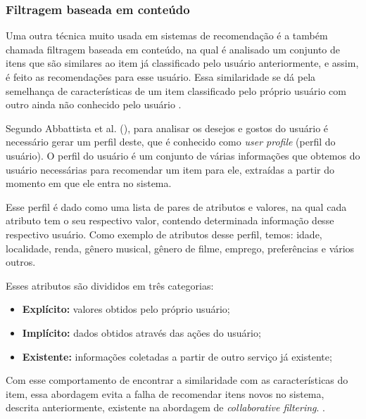 \subsubsection{Filtragem baseada em conteúdo}
\label{Contentbasedfiltering}

Uma outra técnica muito usada em sistemas de recomendação é a também chamada filtragem baseada em conteúdo, na qual é analisado um conjunto de itens que são similares ao item já classificado pelo usuário anteriormente, e assim, é feito as recomendações para esse usuário. Essa similaridade se dá pela semelhança de características de um item classificado pelo próprio usuário com outro ainda não conhecido pelo usuário \cite{Grimaldi:2018}. 

Segundo Abbattista et al. (\citeyear{Abbattista:2002}), para analisar os desejos e gostos do usuário é necessário gerar um perfil deste, que é conhecido como \textit{user profile} (perfil do usuário). O perfil do usuário é um conjunto de várias informações que obtemos do usuário necessárias para recomendar um item para ele, extraídas a partir do momento em que ele entra no sistema.

Esse perfil é dado como uma lista de pares de atributos e valores, na qual cada atributo tem o seu respectivo valor, contendo determinada informação desse respectivo usuário. Como exemplo de atributos desse perfil, temos: idade, localidade, renda, gênero musical, gênero de filme, emprego, preferências e vários outros.

Esses atributos são divididos em três categorias:
\begin{itemize}
    \item \textbf{Explícito:} valores obtidos pelo próprio usuário;

    \item \textbf{Implícito:} dados obtidos através das ações do usuário;

    \item \textbf{Existente:} informações coletadas a partir de outro serviço já existente;
\end{itemize}

Com esse comportamento de encontrar a similaridade com as características do item, essa abordagem evita a falha de recomendar itens novos no sistema, descrita anteriormente, existente na abordagem de \textit{collaborative filtering}. \cite{Luk:2019}.

